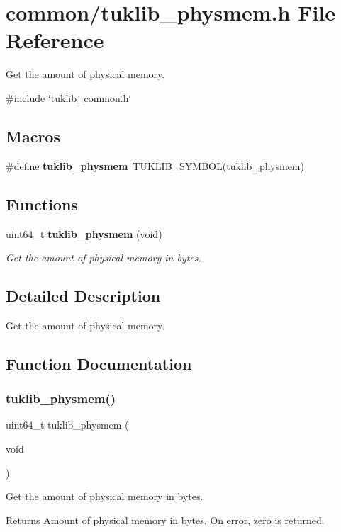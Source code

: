 \section{common/tuklib\+\_\+physmem.h File Reference}
\label{tuklib__physmem_8h}


Get the amount of physical memory.  


{\ttfamily \#include \char`\"{}tuklib\+\_\+common.\+h\char`\"{}}\newline
\subsection*{Macros}
\begin{DoxyCompactItemize}
\item 
\mbox{\label{tuklib__physmem_8h_a084756b2d3a589fa279a76e36dc40a20}} 
\#define {\bfseries tuklib\+\_\+physmem}~T\+U\+K\+L\+I\+B\+\_\+\+S\+Y\+M\+B\+OL(tuklib\+\_\+physmem)
\end{DoxyCompactItemize}
\subsection*{Functions}
\begin{DoxyCompactItemize}
\item 
uint64\+\_\+t \textbf{ tuklib\+\_\+physmem} (void)
\begin{DoxyCompactList}\small\item\em Get the amount of physical memory in bytes. \end{DoxyCompactList}\end{DoxyCompactItemize}


\subsection{Detailed Description}
Get the amount of physical memory. 



\subsection{Function Documentation}
\mbox{\label{tuklib__physmem_8h_abba29dea7d58aed682c6e9fad20838bd}} 
\subsubsection{tuklib\+\_\+physmem()}
{\footnotesize\ttfamily uint64\+\_\+t tuklib\+\_\+physmem (\begin{DoxyParamCaption}\item[{void}]{ }\end{DoxyParamCaption})}



Get the amount of physical memory in bytes. 

\begin{DoxyReturn}{Returns}
Amount of physical memory in bytes. On error, zero is returned. 
\end{DoxyReturn}
